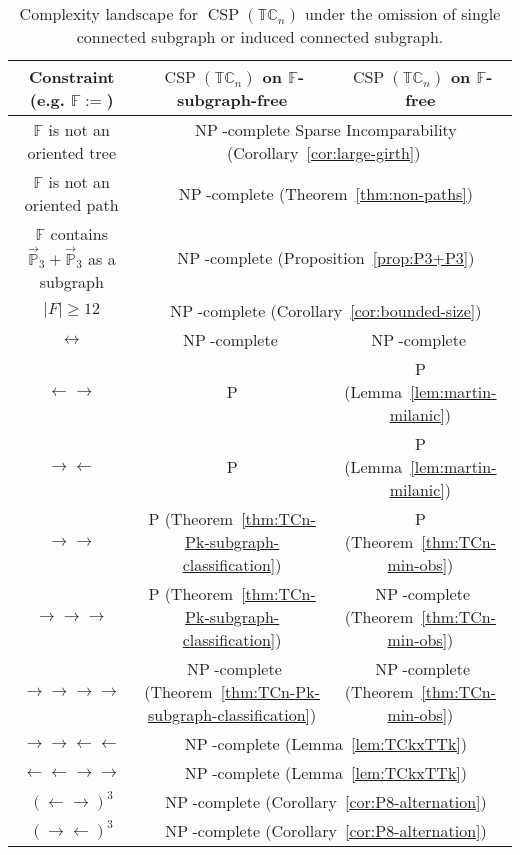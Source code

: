 \documentclass{article}
\theoremstyle{definition}
\theoremstyle{remark}
\DeclareMathOperator{\NP}{NP}
\DeclareMathOperator{\CSP}{CSP}
\newcommand{\bC}{{\mathbb C}}
\newcommand{\bF}{{\mathbb F}}
\newcommand{\bP}{{\mathbb P}}
\newcommand{\bT}{{\mathbb T}}
\begin{document}
\begin{table}[ht!]
    \begin{center}
    \begin{tabular}{|c|c|c|}
\hline
Constraint (\mbox{e.g.} $\bF:=$)  & $\CSP(\bT\bC_n)$ on $\bF$-subgraph-free & $\CSP(\bT\bC_n)$ on $\bF$-free \\
\hline
$\bF$ is not an oriented tree & \multicolumn{2}{c|}{$\NP$-complete Sparse Incomparability (Corollary~\ref{cor:large-girth})} \\
\hline 
$\bF$ is not an oriented path & \multicolumn{2}{c|}{$\NP$-complete (Theorem~\ref{thm:non-paths})} \\
\hline 
$\bF$ contains $\vec{\bP}_3+\vec{\bP}_3$ as a subgraph & \multicolumn{2}{c|}{$\NP$-complete (Proposition~\ref{prop:P3+P3})} \\
\hline
$|F|\ge 12$ & \multicolumn{2}{c|}{$\NP$-complete (Corollary~\ref{cor:bounded-size})}\\
\hline
$\leftrightarrow$ & $\NP$-complete~\cite{bangjensenSIDMA1} &  $\NP$-complete~\cite{bangjensenSIDMA1}\\
\hline
$\leftarrow \rightarrow$ & P  \cite[Lemma 1]{HM14} & P (Lemma~\ref{lem:martin-milanic}) \\
\hline
$\rightarrow \leftarrow$ & P  \cite[Lemma 1]{HM14} & P (Lemma~\ref{lem:martin-milanic})  \\
\hline
$\rightarrow \rightarrow$ & P (Theorem~\ref{thm:TCn-Pk-subgraph-classification}) & P (Theorem~\ref{thm:TCn-min-obs})\\
\hline
$\rightarrow \rightarrow \rightarrow$ & P (Theorem~\ref{thm:TCn-Pk-subgraph-classification}) & $\NP$-complete (Theorem~\ref{thm:TCn-min-obs})\\
\hline
$\rightarrow \rightarrow \rightarrow \rightarrow $ & $\NP$-complete (Theorem~\ref{thm:TCn-Pk-subgraph-classification}) & $\NP$-complete  (Theorem~\ref{thm:TCn-min-obs})\\
\hline
$\rightarrow \rightarrow \leftarrow\leftarrow$ & \multicolumn{2}{c|}{$\NP$-complete (Lemma~\ref{lem:TCkxTTk})}\\
\hline
$\leftarrow\leftarrow \rightarrow\rightarrow$ & \multicolumn{2}{c|}{$\NP$-complete (Lemma~\ref{lem:TCkxTTk})} \\
\hline
$(\leftarrow \rightarrow)^3$ & \multicolumn{2}{c|}{$\NP$-complete (Corollary~\ref{cor:P8-alternation})} \\
\hline
$(\rightarrow \leftarrow)^3$ & \multicolumn{2}{c|}{$\NP$-complete (Corollary~\ref{cor:P8-alternation})}\\
\hline
    \end{tabular}
    \end{center}
    \caption{Complexity landscape for $\CSP(\bT\bC_n)$ under the omission of  single connected subgraph or induced connected subgraph.}
    \label{fig:landscape-TCn-omitting-subgraph-bis}
\end{table}
\end{document}
